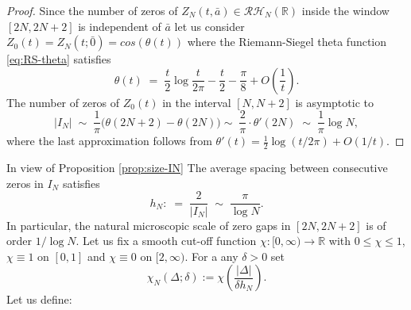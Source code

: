 \documentclass[12pt,reqno]{amsart}
\theoremstyle{plain}
\theoremstyle{definition}
\theoremstyle{remark}
\begin{document}
\begin{proof} Since the number of zeros of $Z_N(t,\bar{a}) \in \mathcal{RH}_N(\mathbb{R})$ inside the
window $[2N,2N+2]$ is independent of $\bar{a}$ let us consider $Z_0(t) = Z_N(t; \bar{0}) = cos(\theta(t))$ where the Riemann-Siegel theta function \eqref{eq:RS-theta} satisfies
\begin{equation}
\theta(t) \;=\; \frac{t}{2}\log\frac{t}{2\pi} - \frac{t}{2} - \frac{\pi}{8}
+O\!\left(\frac{1}{t}\right).
\end{equation}
The number of zeros of $Z_0(t)$ in the interval $[N,N+2]$ is asymptotic to
\begin{equation}
|I_N| \;\sim\; \frac{1}{\pi}\bigl(\theta(2N+2)-\theta(2N)\bigr)\sim\; \frac{2}{\pi} \cdot \theta'(2N)
\;\sim\; \frac{1}{\pi} \log N,
\end{equation}
where the last approximation follows from $\theta'(t) = \tfrac12\log(t/2\pi)+O(1/t)$.
\end{proof}
In view of Proposition \ref{prop:size-IN} The average spacing between consecutive zeros in $I_N$ satisfies
\begin{equation}
\label{eq:h_N}
h_N :\;=\; \frac{2}{|I_N|} \;\sim\; \frac{\pi}{\log N}.
\end{equation}
In particular, the natural microscopic scale of zero gaps in $[2N,2N+2]$ is of order $1/\log N$. Let us fix a smooth cut-off function $\chi: [0,\infty) \rightarrow \mathbb{R} $ with $0\le \chi\le1$, $\chi\equiv1$ on $[0,1]$ and $\chi\equiv0$ on $[2,\infty)$. For a any $\delta>0$ set
\begin{equation}
\chi_N(\Delta ; \delta):=\chi\!\left(\frac{|\Delta|}{\delta h_N}\right).
\end{equation} Let us define:
\end{document}
